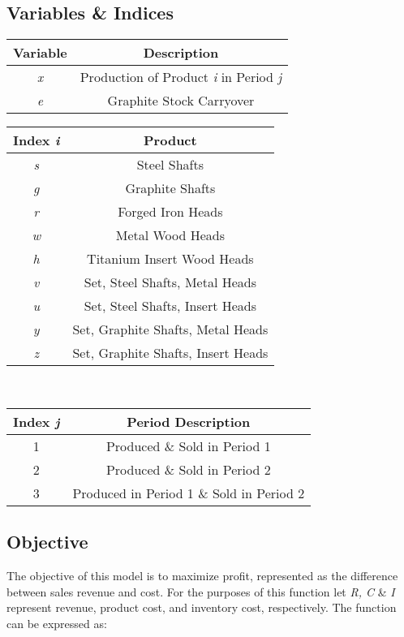 \documentclass{article}
\begin{document}
\subsection{Variables \& Indices}
\begin{tabular}{ |c | c| }
\hline
\textbf{Variable} & \textbf{Description} \\
\hline
\textit{x} & Production of Product \textit{i} in Period \textit{j} \\
\textit{e} & Graphite Stock Carryover \\
\hline
\end{tabular}
\vspace{5mm}

\noindent
\begin{tabular}{| c | c |}
\hline
\textbf{Index \textit{i}} & \textbf{Product} \\
\hline
\textit{s} & Steel Shafts \\
\textit{g} & Graphite Shafts \\
\textit{r} & Forged Iron Heads \\
\textit{w} & Metal Wood Heads \\
\textit{h} & Titanium Insert Wood Heads \\
\textit{v} & Set, Steel Shafts, Metal Heads \\
\textit{u} & Set, Steel Shafts, Insert Heads \\
\textit{y} & Set, Graphite Shafts, Metal Heads \\
\textit{z} & Set, Graphite Shafts, Insert Heads \\
\hline
\end{tabular}
\vspace{5mm}
\\
\begin{tabular}{ | c | c | }
\hline
\textbf{Index \textit{j}} & \textbf{Period Description} \\
\hline
1 & Produced \& Sold in Period 1 \\
2 & Produced \& Sold in Period 2 \\
3 & Produced in Period 1 \& Sold in Period 2 \\
\hline
\end{tabular}

\subsection{Objective}
The objective of this model is to maximize profit, represented as the difference between sales revenue and cost.  For the purposes of this function let \textit{R, C} \& \textit{I} represent revenue, product cost, and inventory cost, respectively.  The function can be expressed as:
\end{document}
